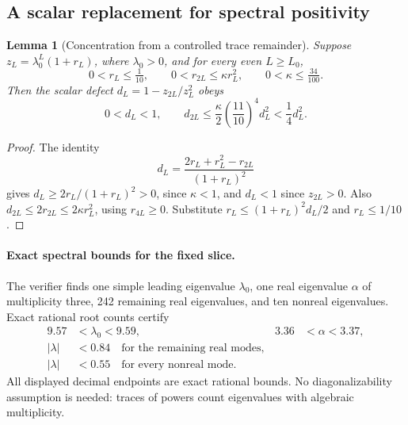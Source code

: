 \documentclass[11pt]{article}
\newtheorem{lemma}{Lemma}
\begin{document}
\subsection{A scalar replacement for spectral positivity}

\begin{lemma}[Concentration from a controlled trace remainder]
	Suppose \(z_L=\lambda_0^L(1+r_L)\), where \(\lambda_0>0\), and
	for every even \(L\ge L_0\),
	\[
		0<r_L\le\tfrac1{10},\qquad
		0<r_{2L}\le\kappa r_L^2,\qquad 0<\kappa\le\tfrac{34}{100}.
	\]
	Then the scalar defect \(d_L=1-z_{2L}/z_L^2\) obeys
	\begin{equation}
		0<d_L<1,\qquad
		d_{2L}\le\frac{\kappa}{2}\left(\frac{11}{10}\right)^4 d_L^2
		<\frac14d_L^2.
		\label{eq:nonreal-square}
	\end{equation}
\end{lemma}

\begin{proof}
	The identity
	\[
		d_L=\frac{2r_L+r_L^2-r_{2L}}{(1+r_L)^2}
	\]
	gives \(d_L\ge2r_L/(1+r_L)^2>0\), since \(\kappa<1\),
	and \(d_L<1\) since \(z_{2L}>0\). Also
	\(d_{2L}\le2r_{2L}\le2\kappa r_L^2\), using
	\(r_{4L}\ge0\). Substitute
	\(r_L\le(1+r_L)^2d_L/2\) and \(r_L\le1/10\).
\end{proof}

\paragraph{Exact spectral bounds for the fixed slice.}
The verifier finds one simple leading eigenvalue \(\lambda_0\),
one real eigenvalue \(\alpha\) of multiplicity three, 242 remaining
real eigenvalues, and ten nonreal eigenvalues. Exact rational root
counts certify
\begin{align*}
	9.57      & <\lambda_0<9.59,                               & 3.36 & <\alpha<3.37, \\
	|\lambda| & <0.84\quad\text{for the remaining real modes}, &      &               \\
	|\lambda| & <0.55\quad\text{for every nonreal mode}.       &      &
\end{align*}
All displayed decimal endpoints are exact rational bounds. No
diagonalizability assumption is needed: traces of powers count
eigenvalues with algebraic multiplicity.
\end{document}
